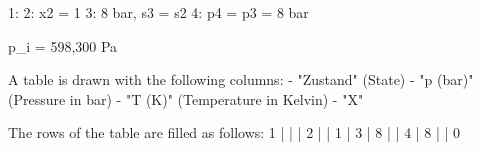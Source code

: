 1:  
2: x2 = 1  
3: 8 bar, s3 = s2  
4: p4 = p3 = 8 bar  

p_i = 598,300 Pa  

A table is drawn with the following columns:  
- "Zustand" (State)  
- "p (bar)" (Pressure in bar)  
- "T (K)" (Temperature in Kelvin)  
- "X"  

The rows of the table are filled as follows:  
1 |   |   |  
2 |   | 1 |  
3 | 8 |   |  
4 | 8 |   | 0